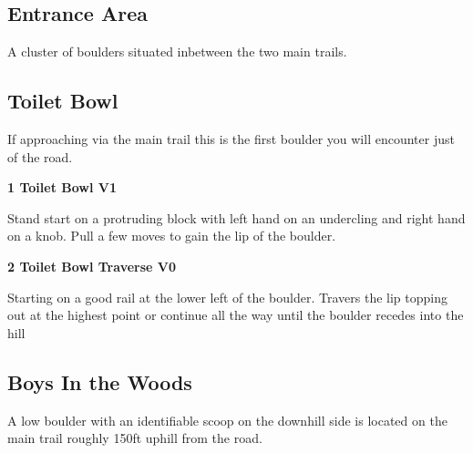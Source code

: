 \begin{multicols}{2}
		\section{Entrance Area}\label{sa:Entrance Area}
	\begin{minipage}{\columnwidth}
	A cluster of boulders situated inbetween the two main trails.
	\end{minipage}

			\subsection*{Toilet Bowl}\label{bf:Toilet Bowl}
			\begin{minipage}{\columnwidth}
			If approaching via the main trail this is the first boulder you will encounter just of the road.
			\end{minipage}
			

					\begin{minipage}{\linewidth}	
					\label{rt:Toilet Bowl}\colorbox{green!20}{\textbf{1 Toilet Bowl V1   }}
					\begin{adjustwidth}{0.5cm}{}				
					Stand start on a protruding block with left hand on an undercling and right hand on a knob. Pull a few moves to gain the lip of the boulder.
					\end{adjustwidth}
					\end{minipage}
					\begin{minipage}{\linewidth}	
					\label{rt:Toilet Bowl Traverse}\colorbox{green!20}{\textbf{2 Toilet Bowl Traverse V0 \ding{72}   }}
					\begin{adjustwidth}{0.5cm}{}				
					Starting on a good rail at the lower left of the boulder. Travers the lip topping out at the highest point or continue all the way until the boulder recedes into the hill
					\end{adjustwidth}
					\end{minipage}
			\subsection*{Boys In the Woods}\label{bf:Boys In the Woods}
			\begin{minipage}{\columnwidth}
			A low boulder with an identifiable scoop on the downhill side is located on the main trail roughly 150ft uphill from the road.
			\end{minipage}
			

\end{multicols}
